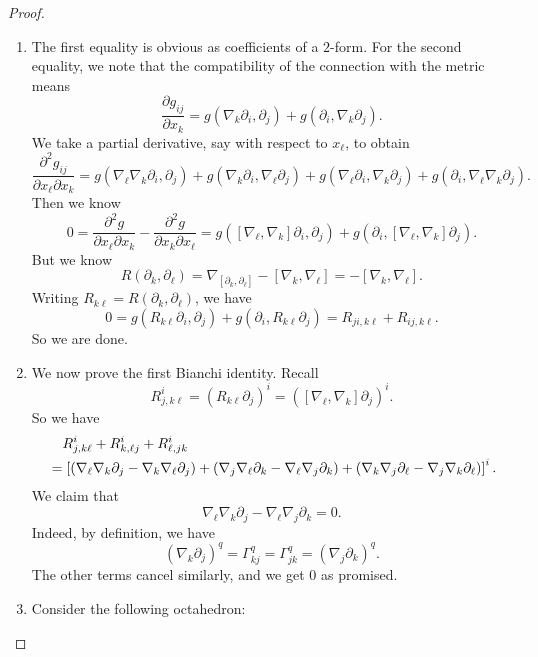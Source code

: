 \documentclass[a4paper]{article}
\begin{document}
\begin{proof}\leavevmode
  \begin{enumerate}
    \item The first equality is obvious as coefficients of a $2$-form. For the second equality, we note that the compatibility of the connection with the metric means
      \[
        \frac{\partial g_{ij}}{\partial x_k} = g(\nabla_k \partial_i, \partial_j) + g(\partial_i, \nabla_k \partial_j).
      \]
      We take a partial derivative, say with respect to $x_\ell$, to obtain
      \[
        \frac{\partial^2 g_{ij}}{\partial x_\ell \partial x_k} = g(\nabla_\ell \nabla_k \partial_i, \partial_j) + g(\nabla_k \partial_i, \nabla_\ell \partial_j) + g(\nabla_\ell \partial_i, \nabla_k \partial_j) + g(\partial_i, \nabla_\ell \nabla_k \partial_j).
      \]
      Then we know
      \[
        0 = \frac{\partial^2 g}{\partial x_\ell \partial x_k} - \frac{\partial^2 g}{\partial x_k \partial x_\ell} = g([\nabla_\ell, \nabla_k] \partial_i, \partial_j) + g(\partial_i, [\nabla_\ell, \nabla_k]\partial_j).
      \]
      But we know
      \[
        R(\partial_k, \partial_\ell) = \nabla_{[\partial_k, \partial_\ell]} - [\nabla_k, \nabla_\ell] = -[\nabla_k, \nabla_\ell].
      \]
      Writing $R_{k\ell} = R(\partial_k, \partial_\ell)$, we have
      \[
        0 = g(R_{k\ell} \partial_i, \partial_j) + g(\partial_i, R_{k\ell} \partial_j) = R_{ji, k\ell} + R_{ij, k\ell}.
      \]
      So we are done.
    \item We now prove the first Bianchi identity. Recall
      \[
        R^i_{j, k\ell} = (R_{k\ell} \partial_j)^i = ([\nabla_\ell, \nabla_k] \partial_j)^i.
      \]
      So we have
      \begin{align*}
        &\hphantom{={}}R^i_{j, k\ell} + R^i_{k, \ell j} + R^i_{\ell, jk}\\
        &= \left[(\nabla_\ell \nabla_k \partial_j - \nabla_k \nabla_\ell \partial_j) + (\nabla_j \nabla_\ell \partial_k - \nabla_\ell \nabla_j \partial_k) + (\nabla_k \nabla_j \partial_\ell - \nabla_j \nabla_k \partial_\ell)\right]^i.
      \end{align*}
      We claim that
      \[
        \nabla_\ell \nabla_k \partial_j - \nabla_\ell \nabla_j \partial_k = 0.
      \]
      Indeed, by definition, we have
      \[
        (\nabla_k \partial_j)^q = \Gamma_{kj}^q = \Gamma_{jk}^q = (\nabla_j \partial_k)^q.
      \]
      The other terms cancel similarly, and we get $0$ as promised.
    \item Consider the following octahedron:
      \begin{center}
\end{center}
\end{enumerate}
\end{proof}
\end{document}
